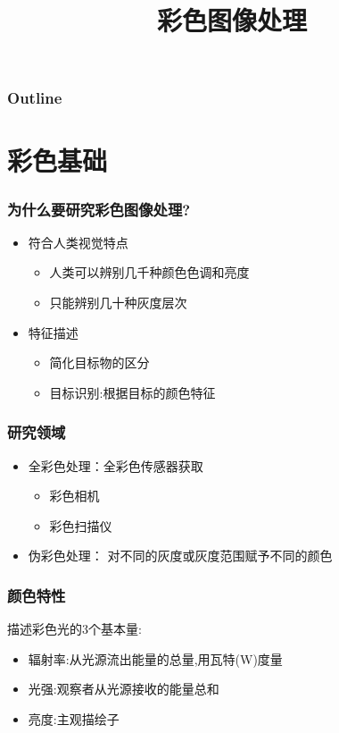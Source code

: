 \documentclass{beamer}
\title{彩色图像处理}
\author{}
\date{}
\begin{document}
\maketitle

\begin{frame}
\frametitle{Outline}
\setcounter{tocdepth}{3}
\tableofcontents
\end{frame}













\section{彩色基础}
\label{sec-1}
\begin{frame}
\frametitle{为什么要研究彩色图像处理?}
\label{sec-1-1}

\begin{itemize}
\item 符合人类视觉特点
\begin{itemize}
\item 人类可以辨别几千种颜色色调和亮度
\item 只能辨别几十种灰度层次
\end{itemize}
\item 特征描述
\begin{itemize}
\item 简化目标物的区分
\item 目标识别:根据目标的颜色特征
\end{itemize}
\end{itemize}
\end{frame}
\begin{frame}
\frametitle{研究领域}
\label{sec-1-2}

\begin{itemize}
\item 全彩色处理：全彩色传感器获取
\begin{itemize}
\item 彩色相机
\item 彩色扫描仪
\end{itemize}
\item 伪彩色处理： 对不同的灰度或灰度范围赋予不同的颜色
\end{itemize}
\end{frame}
\begin{frame}
\frametitle{颜色特性}
\label{sec-1-3}

描述彩色光的3个基本量:
\begin{itemize}
\item 辐射率:从光源流出能量的总量,用瓦特(W)度量
\item 光强:观察者从光源接收的能量总和
\item 亮度:主观描绘子
\end{itemize}
\end{frame}
\end{document}
